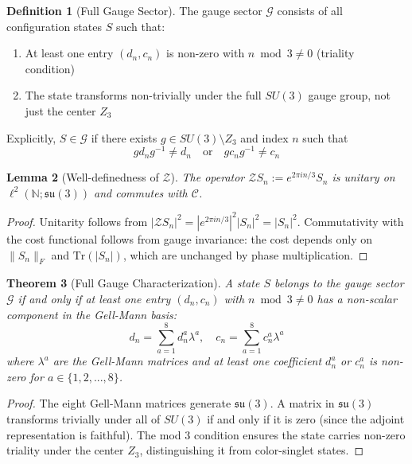\documentclass[11pt]{article}
\numberwithin{equation}{section}
\newtheorem{theorem}{Theorem}[section]
\newtheorem{lemma}[theorem]{Lemma}
\theoremstyle{definition}
\newtheorem{definition}[theorem]{Definition}
\theoremstyle{remark}
\begin{document}
\begin{definition}[Full Gauge Sector]
\label{def:gauge-sector-full}
The gauge sector $\mathcal{G}$ consists of all configuration states $S$ such that:
\begin{enumerate}
\item At least one entry $(d_n, c_n)$ is non-zero with $n \bmod 3 \neq 0$ (triality condition)
\item The state transforms non-trivially under the full $SU(3)$ gauge group, not just the center $Z_3$
\end{enumerate}
Explicitly, $S \in \mathcal{G}$ if there exists $g \in SU(3) \setminus Z_3$ and index $n$ such that
\begin{equation}
g d_n g^{-1} \neq d_n \quad \text{or} \quad g c_n g^{-1} \neq c_n
\end{equation}
\end{definition}

\begin{lemma}[Well-definedness of $\mathcal{Z}$]
The operator $\mathcal{Z}S_n := e^{2\pi i n/3}S_n$ is unitary on $\ell^2(\mathbb{N};\mathfrak{su}(3))$ and commutes with $\mathcal{C}$.
\end{lemma}

\begin{proof}
Unitarity follows from $|\mathcal{Z}S_n|^2 = |e^{2\pi i n/3}|^2|S_n|^2 = |S_n|^2$. Commutativity with the cost functional follows from gauge invariance: the cost depends only on $\|S_n\|_F$ and $\text{Tr}(|S_n|)$, which are unchanged by phase multiplication.
\end{proof}

\begin{theorem}[Full Gauge Characterization]
\label{thm:full-gauge}
A state $S$ belongs to the gauge sector $\mathcal{G}$ if and only if at least one entry $(d_n, c_n)$ with $n \bmod 3 \neq 0$ has a non-scalar component in the Gell-Mann basis:
\begin{equation}
d_n = \sum_{a=1}^{8} d_n^a \lambda^a, \quad c_n = \sum_{a=1}^{8} c_n^a \lambda^a
\end{equation}
where $\lambda^a$ are the Gell-Mann matrices and at least one coefficient $d_n^a$ or $c_n^a$ is non-zero for $a \in \{1,2,...,8\}$.
\end{theorem}

\begin{proof}
The eight Gell-Mann matrices generate $\mathfrak{su}(3)$. A matrix in $\mathfrak{su}(3)$ transforms trivially under all of $SU(3)$ if and only if it is zero (since the adjoint representation is faithful). The mod 3 condition ensures the state carries non-zero triality under the center $Z_3$, distinguishing it from color-singlet states.
\end{proof}
\end{document}
